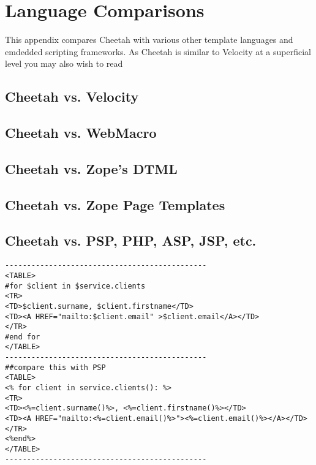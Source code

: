 \section{Language Comparisons}
\label{comparisons}

This appendix compares Cheetah with various other template languages and
emdedded scripting frameworks.  As Cheetah is similar to Velocity at a
superficial level you may also wish to read 

\subsection{Cheetah vs. Velocity}


\subsection{Cheetah vs. WebMacro}

\subsection{Cheetah vs. Zope's DTML}

\subsection{Cheetah vs. Zope Page Templates}

\subsection{Cheetah vs. PSP, PHP, ASP, JSP, etc.}

\begin{verbatim}
----------------------------------------------
<TABLE>
#for $client in $service.clients
<TR>
<TD>$client.surname, $client.firstname</TD>
<TD><A HREF="mailto:$client.email" >$client.email</A></TD>
</TR>
#end for
</TABLE>
----------------------------------------------
##compare this with PSP
<TABLE>
<% for client in service.clients(): %>
<TR>
<TD><%=client.surname()%>, <%=client.firstname()%></TD>
<TD><A HREF="mailto:<%=client.email()%>"><%=client.email()%></A></TD>
</TR>
<%end%>
</TABLE>
----------------------------------------------
\end{verbatim}
